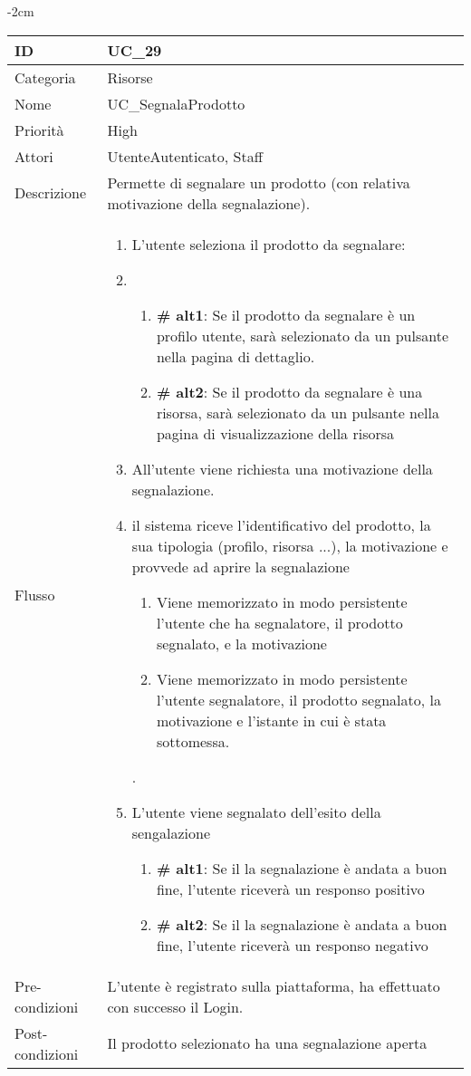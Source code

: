 \begin{center}
\begin{table}[bp]
    \centering
    \addtolength{\leftskip} {-2cm}
\begin{tabular}{ |p{2.6cm}|p{13cm}|  }
\hline
ID & UC\_29 \\\hline
Categoria & Risorse\\\hline
Nome & UC\_SegnalaProdotto\\\hline
Priorità & High \\\hline
Attori &  UtenteAutenticato, Staff \\\hline
Descrizione & Permette di segnalare un prodotto (con relativa motivazione della segnalazione).\\\hline
Flusso &  	\begin{enumerate}
			\item L'utente seleziona il prodotto da segnalare:
			\item \begin{enumerate}[label= ]
				\item \textbf{\# alt1}: Se il prodotto da segnalare è un profilo utente, sarà selezionato da un pulsante nella pagina di dettaglio.
				\item \textbf{\# alt2}: Se il prodotto da segnalare è una risorsa, sarà selezionato da un pulsante nella pagina di visualizzazione della risorsa
				\end{enumerate}
			\item All'utente viene richiesta una motivazione della segnalazione.
			\item il sistema riceve l'identificativo del prodotto, la sua tipologia (profilo, risorsa ...), la motivazione e provvede ad aprire la segnalazione
			\begin{enumerate}[label=\arabic*. ]
				\item Viene memorizzato in modo persistente l'utente che ha segnalatore, il prodotto segnalato, e la motivazione
				\item Viene memorizzato in modo persistente l'utente segnalatore, il prodotto segnalato, la motivazione e l'istante in cui è stata sottomessa.
			\end{enumerate}.
			\item L'utente viene segnalato dell'esito della sengalazione
			\begin{enumerate}[label= ]
				\item \textbf{\# alt1}: Se il la segnalazione è andata a buon fine, l'utente riceverà un responso positivo
				\item \textbf{\# alt2}: Se il la segnalazione è andata a buon fine, l'utente riceverà un responso negativo
			\end{enumerate}
			\end{enumerate}
			\\\hline
Pre-condizioni & L'utente è registrato sulla piattaforma, ha effettuato con successo il Login.\\\hline
Post-condizioni & Il prodotto selezionato ha una segnalazione aperta\\\hline
\end{tabular}
\label{table_use_case:29}\newline
\end{table}


\end{center}
